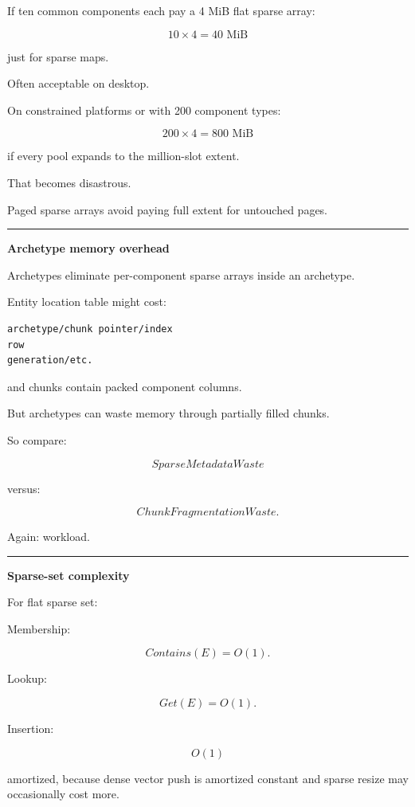 If ten common components each pay a 4 MiB flat sparse array:

\[
10\times4
=
40\text{ MiB}
\]

just for sparse maps.

Often acceptable on desktop.

On constrained platforms or with 200 component types:

\[
200\times4
=
800\text{ MiB}
\]

if every pool expands to the million-slot extent.

That becomes disastrous.

Paged sparse arrays avoid paying full extent for untouched pages.

\begin{center}\rule{0.5\linewidth}{0.5pt}\end{center}

\textbf{Archetype memory overhead}

Archetypes eliminate per-component sparse arrays inside an archetype.

Entity location table might cost:

\begin{verbatim}
archetype/chunk pointer/index
row
generation/etc.
\end{verbatim}

and chunks contain packed component columns.

But archetypes can waste memory through partially filled chunks.

So compare:

\[
SparseMetadataWaste
\]

versus:

\[
ChunkFragmentationWaste.
\]

Again: workload.

\begin{center}\rule{0.5\linewidth}{0.5pt}\end{center}

\textbf{Sparse-set complexity}

For flat sparse set:

Membership:

\[
Contains(E)=O(1).
\]

Lookup:

\[
Get(E)=O(1).
\]

Insertion:

\[
O(1)
\]

amortized, because dense vector push is amortized constant and sparse resize may occasionally cost more.

